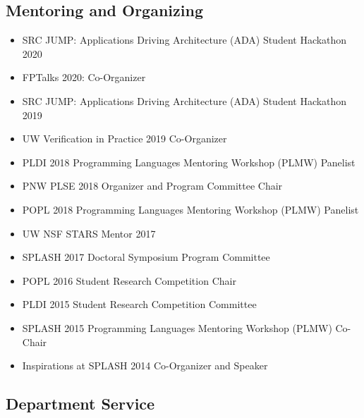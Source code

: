 \documentclass[10pt]{article}
\begin{document}
\subsection*{Mentoring and Organizing}

\begin{itemize}
  \item SRC JUMP: Applications Driving Architecture (ADA) Student Hackathon 2020
  \item FPTalks 2020: Co-Organizer
  \item SRC JUMP: Applications Driving Architecture (ADA) Student Hackathon 2019
  \item UW Verification in Practice 2019 Co-Organizer
  \item PLDI 2018 Programming Languages Mentoring Workshop (PLMW) Panelist
  \item PNW PLSE 2018 Organizer and Program Committee Chair
  \item POPL 2018 Programming Languages Mentoring Workshop (PLMW) Panelist
  \item UW NSF STARS Mentor 2017
  \item SPLASH 2017 Doctoral Symposium Program Committee
  \item POPL 2016 Student Research Competition Chair
  \item PLDI 2015 Student Research Competition Committee
  \item SPLASH 2015 Programming Languages Mentoring Workshop (PLMW) Co-Chair
  \item Inspirations at SPLASH 2014 Co-Organizer and Speaker
\end{itemize}

\subsection*{Department Service}
\end{document}
